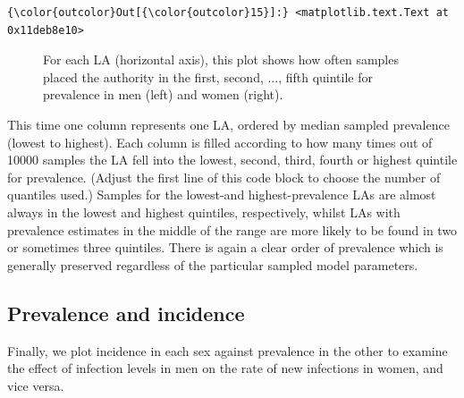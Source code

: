 \documentclass{article}
\begin{document}
    \begin{footnotesize}
            \begin{Verbatim}[commandchars=\\\{\}]
{\color{outcolor}Out[{\color{outcolor}15}]:} <matplotlib.text.Text at 0x11deb8e10>
\end{Verbatim}
    \end{footnotesize}
        
    \begin{figure}
        \begin{center}\end{center}
        \caption{For each LA (horizontal axis), this plot shows how often samples placed the authority in the first, second, ..., fifth quintile for prevalence in men (left) and women (right).}
        \label{}
    \end{figure}
    
    This time one column represents one LA, ordered by median sampled
prevalence (lowest to highest). Each column is filled according to how
many times out of 10000 samples the LA fell into the lowest, second,
third, fourth or highest quintile for prevalence. (Adjust the first line
of this code block to choose the number of quantiles used.) Samples for
the lowest-and highest-prevalence LAs are almost always in the lowest
and highest quintiles, respectively, whilst LAs with prevalence
estimates in the middle of the range are more likely to be found in two
or sometimes three quintiles. There is again a clear order of prevalence
which is generally preserved regardless of the particular sampled model
parameters.

    \subsection{Prevalence and incidence}\label{prevalence-and-incidence}

Finally, we plot incidence in each sex against prevalence in the other
to examine the effect of infection levels in men on the rate of new
infections in women, and vice versa.
\end{document}
